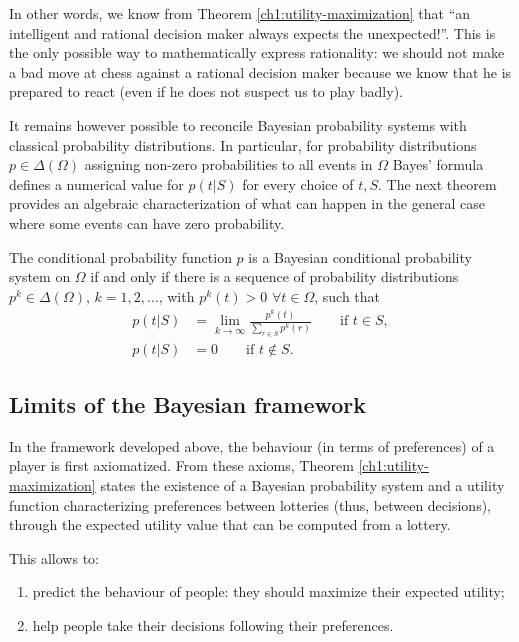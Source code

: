 In other words, we know from Theorem \ref{ch1:utility-maximization} that ``an intelligent and rational decision maker always expects the unexpected!''.
This is the only possible way to mathematically express rationality: we should not make a bad move at chess against a rational decision maker because we know that he is prepared to react (even if he does not suspect us to play badly).

It remains however possible to reconcile Bayesian probability systems with classical probability distributions. In particular, for  probability distributions $p \in \Delta(\Omega)$ assigning non-zero probabilities to all events in $\Omega$ Bayes' formula defines a numerical value for $p(t|S)$ for every choice of $t,S$.  The next theorem provides an algebraic characterization of what can happen in the general case where some events can have zero probability.

\begin{theorem}
The conditional probability function $p$ is a Bayesian conditional probability system on $\Omega$ if and only if there is a sequence of probability distributions $p^k \in \Delta(\Omega)$, $k = 1, 2, \ldots$, with $p^k(t) > 0$ $\forall t \in \Omega$, such that
\begin{equation}
\begin{aligned}
p(t|S) & = \lim_{k \rightarrow \infty} \frac{p^k(t)}{\sum_{r \in S} p^k(r)} \qquad \text{if $t \in S$},\\
p(t|S) & = 0  \qquad \text{if $t \not \in S$}.
\end{aligned}
\end{equation}
\end{theorem}

\subsection{Limits of the Bayesian framework}

In the framework developed above, the behaviour (in terms of preferences) of a player is first axiomatized. From these axioms, Theorem \ref{ch1:utility-maximization} states the existence of a Bayesian probability system and a utility function characterizing preferences between lotteries (thus, between decisions), through the expected utility value that can be computed from a lottery.

This allows to:
\begin{enumerate}
\item predict the behaviour of people:  they should maximize their expected utility;
\item help people take their decisions following their preferences.
\end{enumerate}

